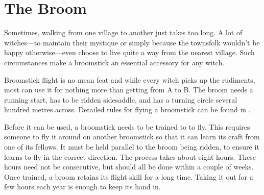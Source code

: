 





\section{The Broom}

Sometimes, walking from one village to another just takes too long.
A lot of witches---to maintain their mystique or simply because the townsfolk wouldn't be happy otherwise---even choose to live quite a way from the nearest village.
Such circumstances make a broomstick an essential accessory for any witch.

Broomstick flight is no mean feat and while every witch picks up the rudiments, most can use it for nothing more than getting from A to B.
The broom needs a running start, has to be ridden sidesaddle, and has a turning circle several hundred metres across.
Detailed rules for flying a broomstick can be found in .

Before it can be used, a broomstick needs to be trained to to fly.
This requires someone to fly it around on another broomstick so that it can learn its craft from one of its fellows.
It must be held parallel to the broom being ridden, to ensure it learns to fly in the correct direction.
The process takes about eight hours.
These hours need not be consecutive, but should all be done within a couple of weeks.
Once trained, a broom retains its flight skill for a long time.
Taking it out for a few hours each year is enough to keep its hand in.

